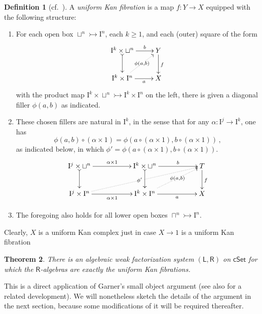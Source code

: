 \documentclass[12pt]{article}
\newcommand{\cSet}{\ensuremath{\mathsf{cSet}}}
\newcommand{\LL}{\ensuremath{\mathsf{L}}}
\newcommand{\RR}{\ensuremath{\mathsf{R}}}
\newcommand{\mono}{\ensuremath{\rightarrowtail}}
\newcommand{\I}{\ensuremath{\mathrm{I}}}
\newtheorem{theorem}{Theorem}
\theoremstyle{remark}
\theoremstyle{definition}
\newtheorem{definition}[theorem]{Definition}
\begin{document}
\begin{definition}[cf.~\cite{BCH}]
A \emph{uniform Kan fibration} is a map $f : Y\to X$ equipped with the following structure: 
\begin{enumerate}

\item  For each open box $\sqcup^n \mono \I^n$, each $k\geq 1$, and each (outer) square of the form
\begin{equation}%
\xymatrix{
\I^k \times \sqcup^n \ar@{>->}[d] \ar[r]^-{b} & Y \ar[d]^{f} \\
\I^k \times \I^n \ar[r]_-{a} \ar@{.>}[ru]|-{\phi(a,b)} & X
}
\end{equation}
with the product map $\I^k\times\sqcup^n \mono \I^k\times\I^n$ on the left, there is given a diagonal filler $\phi(a,b)$ as indicated.

\item These chosen fillers are natural in $\I^k$, in the sense that for any $\alpha : \I^j \to \I^k$, one has
\[
\phi(a,b)\circ(\alpha\times 1) = \phi(a\circ (\alpha\times 1), b\circ (\alpha\times 1))\,,
\]
as indicated below, in which $\phi' = \phi(a\circ(\alpha\times 1), b\circ(\alpha\times 1))$.
\begin{equation}\label{diagram:coherencefillers}
\xymatrix{
\I^j \times \sqcup^n \ar@{>->}[d] \ar[rr]^{\alpha\times 1} && \I^k \times \sqcup^n  \ar@{>->}[d] \ar[rr]^-{b} && \ar[d]^{f} T \\
\I^j \times \I^n \ar[rr]_{\alpha\times 1} \ar@{..>}[rrrru]|{\phi'\ } && \I^k \times \I^n \ar[rr]_-{a} \ar@{.>}[rru]|-{\phi(a,b)}  && X
}
\end{equation}

\item The foregoing also holds for all lower open boxes $\sqcap^n \mono \I^n$.

\end{enumerate}
\end{definition}

Clearly, $X$ is a uniform Kan complex just in case $X\to 1$ is a uniform Kan fibration

\begin{theorem}\label{thm:AWFS1}
There is an algebraic weak factorization system $(\LL,\RR)$ on $\cSet$ for which the $\RR$-algebras are exactly the uniform Kan fibrations.
\end{theorem}

This is a direct application of Garner's small object argument \cite{Garner} (see also \cite{GS} for a related development). We will nonetheless sketch the details of the argument in the next section, because some modifications of it will be required thereafter.  
\end{document}
